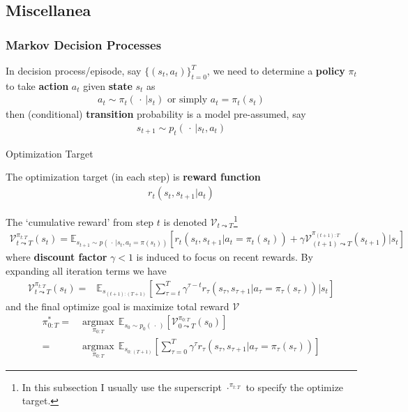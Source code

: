 \subsection{Miscellanea}


\subsubsection{Markov Decision Processes}
In decision process/episode, say $ \{(s_t,a_t)\}_{t=0}^T $, we need to determine a \textbf{policy} $ \pi_t $ to take \textbf{action}  $ a_t $ given \textbf{state}  $ s_t $ as
\begin{align}
    a_t\sim \pi_t(\, \cdot \,| s_t) \text{ or simply }a_t=\pi_t(s_t)
\end{align}
then (conditional) \textbf{transition}  probability is a model pre-assumed, say
\begin{align}
    s_{t+1}\sim p_t\left(\, \cdot \, |s_t,a_t\right) 
\end{align}


\begin{point}
    Optimization Target
\end{point}

The optimization target (in each step) is \textbf{reward function} 
\begin{align}
    r_t(s_t,s_{t+1}|a_t)
\end{align}

The `cumulative reward' from step $ t $ is denoted $ \mathcal{V}_{t\leadsto T} $\footnote{In this subsection I usually use the superscript $ \cdot ^{\pi_{t:T}} $ to specify the optimize target.} 
\begin{align}\label{EqaVLearningIteration}
    \mathcal{V}_{t\leadsto T}^{\pi_{t:T}}(s_t)=\mathbb{E}_{s_{t+1}\sim p\left(\, \cdot \, |s_t,a_t=\pi(s_t)\right)}\left[ r_t\left(s_t,s_{t+1}|a_t=\pi_t(s_t)\right)+\gamma \mathcal{V}_{(t+1)\leadsto T}^{\pi_{(t+1):T}} (s_{t+1})\big|s_t\right]
\end{align}
where \textbf{discount factor} $ \gamma<1  $ is induced to focus on recent rewards. By expanding all iteration terms we have
\begin{align}
    \mathcal{V}_{t\leadsto T}^{\pi_{t:T}}(s_t)=&\mathbb{E}_{s_{(t+1):(T+1)}}\left[ \sum_{\tau = t}^T\gamma ^{\tau-t}r_\tau\left(s_\tau,s_{\tau+1}|a_\tau=\pi_\tau(s_\tau)\right)\big|s_t \right]
\end{align}
and the final optimize goal is maximize total reward $ \mathcal{V} $
\begin{align}\label{EqaVLearningTarget}
    \pi_{0:T}^*=&\mathop{\arg\max}\limits_{\pi_{0:T}}\,\mathbb{E}_{s_0\sim p_0(\, \cdot \, )}\left[ \mathcal{V}_{0\leadsto T}^{\pi_{0:T}}(s_0) \right]  \\
    =&\mathop{\arg\max}\limits_{\pi_{0:T}}\,\mathbb{E}_{s_{0:(T+1)}}\left[ \sum_{\tau = 0}^T\gamma ^{\tau}r_\tau\left(s_\tau,s_{\tau+1}|a_\tau=\pi_\tau(s_\tau)\right) \right]
\end{align}



